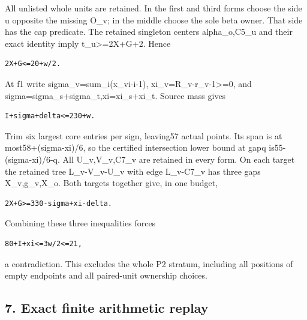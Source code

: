 \documentclass[10pt,a4paper]{article}
\theoremstyle{definition}
\begin{document}
All unlisted whole units are retained. In the first and third forms
choose the side u opposite the missing O\_\allowbreak{}v; in the middle choose the
sole beta owner. That side has the cap predicate. The retained singleton
centers alpha\_\allowbreak{}o,\allowbreak{}C5\_\allowbreak{}u and their exact identity imply
t\_\allowbreak{}u\textgreater=\allowbreak{}2X+\allowbreak{}G+\allowbreak{}2. Hence

\begin{lstlisting}
2X+G<=20+w/2.
\end{lstlisting}

At f1 write sigma\_\allowbreak{}v=\allowbreak{}sum\_\allowbreak{}i(x\_\allowbreak{}vi-i-1),\allowbreak{} xi\_\allowbreak{}v=\allowbreak{}R\_\allowbreak{}v-r\_\allowbreak{}v-1\textgreater=\allowbreak{}0,\allowbreak{}
and sigma=\allowbreak{}sigma\_\allowbreak{}s+\allowbreak{}sigma\_\allowbreak{}t,\allowbreak{}xi=\allowbreak{}xi\_\allowbreak{}s+\allowbreak{}xi\_\allowbreak{}t. Source mass gives

\begin{lstlisting}
I+sigma+delta<=230+w.
\end{lstlisting}

Trim six largest core entries per sign,\allowbreak{} leaving57 actual points. Its
span is at most58+\allowbreak{}(sigma-xi)/6,\allowbreak{} so the certified intersection lower
bound at gapq is55-(sigma-xi)/6-q. All U\_\allowbreak{}v,\allowbreak{}V\_\allowbreak{}v,\allowbreak{}C7\_\allowbreak{}v are retained in
every form. On each target the retained tree L\_\allowbreak{}v-V\_\allowbreak{}v-U\_\allowbreak{}v with edge
L\_\allowbreak{}v-C7\_\allowbreak{}v has three gaps X\_\allowbreak{}v,\allowbreak{}g\_\allowbreak{}v,\allowbreak{}X\_\allowbreak{}o. Both targets together give,\allowbreak{} in
one budget,\allowbreak{}

\begin{lstlisting}
2X+G>=330-sigma+xi-delta.
\end{lstlisting}

Combining these three inequalities forces

\begin{lstlisting}
80+I+xi<=3w/2<=21,
\end{lstlisting}

a contradiction. This excludes the whole P2 stratum,\allowbreak{} including all
positions of empty endpoints and all paired-unit ownership choices.

\hypertarget{exact-finite-arithmetic-replay}{%
\subsection{7. Exact finite arithmetic
replay}\label{exact-finite-arithmetic-replay}}
\end{document}
